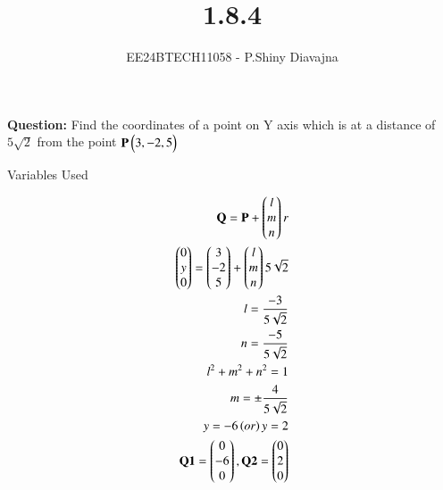 \documentclass[journal]{IEEEtran}
\begin{document}

\vspace{3cm}

\title{1.8.4}
\author{EE24BTECH11058 - P.Shiny Diavajna}
{\let\newpage\relax\maketitle}

\renewcommand{\thefigure}{\theenumi}
\renewcommand{\thetable}{\theenumi}
\setlength{\intextsep}{10pt} %


\renewcommand{\thetable}{\theenumi}

\textbf{Question:} Find the coordinates of a point on Y axis which is at a distance of $5\sqrt2$ from the point $\mathbf{P}\begin{pmatrix}3,-2,5\end{pmatrix}$\\

   \solution
   \begin{table}[h!]    
     \centering
     
     \caption{Variables Used}
     \label{}
   \end{table}

   \begin{align*}
	   \mathbf{Q}=\mathbf{P}+\begin{pmatrix}l\\m\\n\end{pmatrix} r\\
	   \begin{pmatrix}0\\y\\0\end{pmatrix}=\begin{pmatrix}3\\-2\\5\end{pmatrix} + \begin{pmatrix}l\\m\\n\end{pmatrix} 5\sqrt2\\
	   l=\frac{-3}{5\sqrt2}\\
	   n=\frac{-5}{5\sqrt2}\\
           l^{2}+m^{2}+n^{2}=1\\
	   m=\pm \frac{4}{5\sqrt2}\\
	   y=-6 \left(or\right) y=2\\
	   \mathbf{Q1}=\begin{pmatrix}0\\-6\\0\end{pmatrix}  ,  \mathbf{Q2}=\begin{pmatrix}0 \\2\\0\end{pmatrix}\\
   \end{align*}
\end{document}
